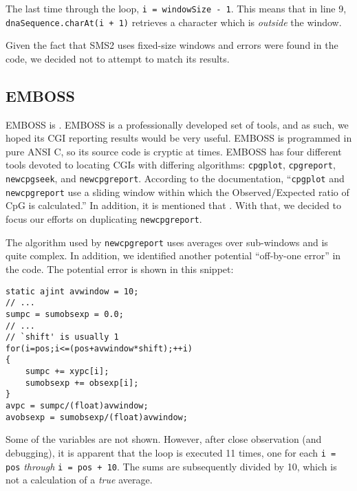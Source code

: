 \documentclass{bioinfo}
\begin{document}
The last time through the loop, \verb|i = windowSize - 1|.
This means that in line 9,
\verb|dnaSequence.charAt(i + 1)|
retrieves a character which is \emph{outside} the window.

Given the fact that SMS2 uses fixed-size windows and errors were found
in the code, we decided not to attempt to match its results.

\subsection{EMBOSS}

EMBOSS is . EMBOSS is a professionally developed set of
tools, and as such, we hoped its CGI reporting results would be very
useful. EMBOSS is programmed in pure ANSI C, so its source code is
cryptic at times. EMBOSS has four different tools devoted to locating
CGIs with differing algorithms: \texttt{cpgplot}, \texttt{cpgreport},
\texttt{newcpgseek}, and \texttt{newcpgreport}. According to the
documentation, ``\texttt{cpgplot} and \texttt{newcpgreport} use a
sliding window within which the Observed/Expected ratio of CpG is
calculated.'' In addition, it is mentioned that
. With
that, we decided to focus our efforts on duplicating
\texttt{newcpgreport}.

The algorithm used by \texttt{newcpgreport} uses averages over
sub-windows and is quite complex. In addition, we identified another
potential ``off-by-one error'' in the code. The potential error is
shown in this snippet:

\begin{verbatim}
static ajint avwindow = 10;
// ...
sumpc = sumobsexp = 0.0;
// ...
// `shift' is usually 1
for(i=pos;i<=(pos+avwindow*shift);++i)
{
    sumpc += xypc[i];
    sumobsexp += obsexp[i];
}
avpc = sumpc/(float)avwindow;
avobsexp = sumobsexp/(float)avwindow;
\end{verbatim}

Some of the variables are not shown. However, after close observation
(and debugging), it is apparent that the loop is executed 11 times,
one for each \verb|i = pos| \emph{through} \verb|i = pos + 10|. The
sums are subsequently divided by 10, which is not a calculation of a
\emph{true} average.
\end{document}
